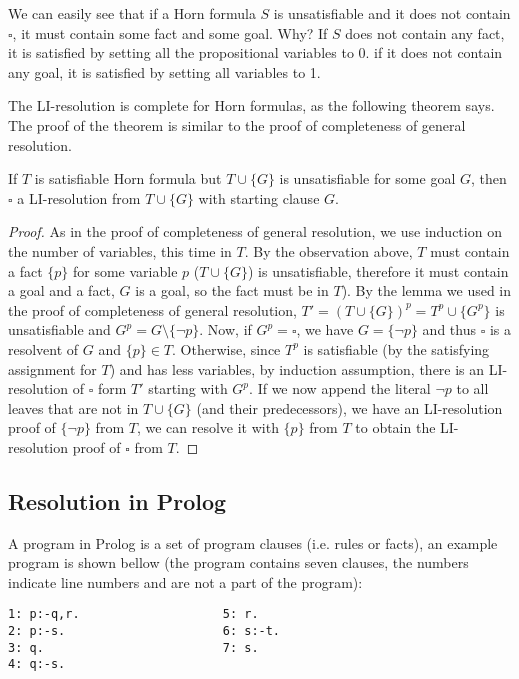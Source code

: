 We can easily see that if a Horn formula $S$ is unsatisfiable and it does not contain $\square$, it must contain some fact and some goal. Why? If $S$ does not contain any fact, it is satisfied by setting all the propositional variables to 0. if it does not contain any goal, it is satisfied by setting all variables to 1.

The LI-resolution is complete for Horn formulas, as the following theorem says. The proof of the theorem is similar to the proof of completeness of general resolution.

\begin{theorem}
If $T$ is satisfiable Horn formula but $T \cup \{G\}$ is unsatisfiable for some goal $G$, then $\square$ a LI-resolution from $T \cup \{G\}$ with starting clause $G$.
\end{theorem}
\begin{proof}
As in the proof of completeness of general resolution, we use induction on the number of variables, this time in $T$. By the observation above, $T$ must contain a fact $\{p\}$ for some variable $p$ ($T \cup \{G\}$) is unsatisfiable, therefore it must contain a goal and a fact, $G$ is a goal, so the fact must be in $T$). By the lemma we used in the proof of completeness of general resolution, $T' = (T \cup \{G\})^p = T^p \cup \{G^p\}$ is unsatisfiable and $G^p = G \setminus \{\neg p\}$. Now, if $G^p = \square$, we have $G = \{\neg p\}$ and thus $\square$ is a resolvent of $G$ and $\{p\}\in T$. Otherwise, since $T^p$ is satisfiable (by the satisfying assignment for $T$) and has less variables, by induction assumption, there is an LI-resolution of $\square$ form $T'$ starting with $G^p$. If we now append the literal $\neg p$ to all leaves that are not in $T \cup \{G\}$ (and their predecessors), we have an LI-resolution proof of $\{\neg p\}$ from $T$, we can resolve it with $\{p\}$ from $T$ to obtain the LI-resolution proof of $\square$ from $T$.
\end{proof}

\subsection{Resolution in Prolog}

A program in Prolog is a set of program clauses (i.e. rules or facts), an example program is shown bellow (the program contains seven clauses, the numbers indicate line numbers and are not a part of the program):

\begin{verbatim}
1: p:-q,r.                    5: r.
2: p:-s.                      6: s:-t.
3: q.                         7: s.
4: q:-s.
\end{verbatim}

